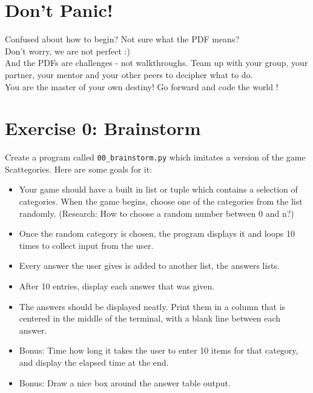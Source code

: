 \documentclass{42-en}
\begin{document}
\chapter{Don't Panic!}

Confused about how to begin? Not sure what the PDF means?\\

Don't worry, we are not perfect :)\\

And the PDFs are challenges - not walkthroughs. Team up with your group, your partner,
your mentor and your other peers to decipher what to do.\\

You are the master of your own destiny! Go forward and code the world !

\startexercices



\chapter{Exercise 0: Brainstorm}
\exnotes{}
\makeheaderfiles

Create a program called \texttt{00\_brainstorm.py} which imitates a version of the game Scattegories. Here are some goals for it:

\begin{itemize}
	\item Your game should have a built in list or tuple which contains a selection of categories. When the game begins, choose one of the categories from the list randomly. (Research: How to choose a random number between 0 and n?)
	\item Once the random category is chosen, the program displays it and loops 10 times to collect input from the user.
	\item Every answer the user gives is added to another list, the answers lists.
	\item After 10 entries, display each answer that was given.
	\item The answers should be displayed neatly. Print them in a column that is centered in the middle of the terminal, with a blank line between each answer.
	\item Bonus: Time how long it takes the user to enter 10 items for that category, and display the elapsed time at the end.
	\item Bonus: Draw a nice box around the answer table output.
\end{itemize}
\end{document}
